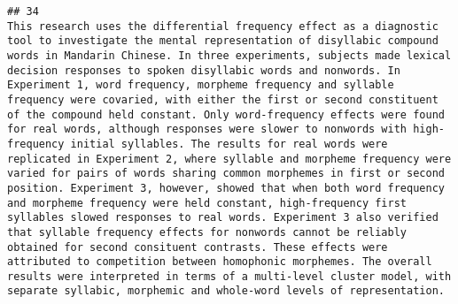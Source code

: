 \documentclass[
  english,
  man]{apa6}
\begin{document}
\begin{verbatim}
## 34                                                                                                                                                                                                                                                                                                                                                                                                                                                                                                                                                                                                                                                                                                                                                                                                                                                                                                                                                                                                                                                                                                                                                                                                                                                                                                                                          This research uses the differential frequency effect as a diagnostic tool to investigate the mental representation of disyllabic compound words in Mandarin Chinese. In three experiments, subjects made lexical decision responses to spoken disyllabic words and nonwords. In Experiment 1, word frequency, morpheme frequency and syllable frequency were covaried, with either the first or second constituent of the compound held constant. Only word-frequency effects were found for real words, although responses were slower to nonwords with high-frequency initial syllables. The results for real words were replicated in Experiment 2, where syllable and morpheme frequency were varied for pairs of words sharing common morphemes in first or second position. Experiment 3, however, showed that when both word frequency and morpheme frequency were held constant, high-frequency first syllables slowed responses to real words. Experiment 3 also verified that syllable frequency effects for nonwords cannot be reliably obtained for second consituent contrasts. These effects were attributed to competition between homophonic morphemes. The overall results were interpreted in terms of a multi-level cluster model, with separate syllabic, morphemic and whole-word levels of representation.

\end{verbatim}
\end{document}
